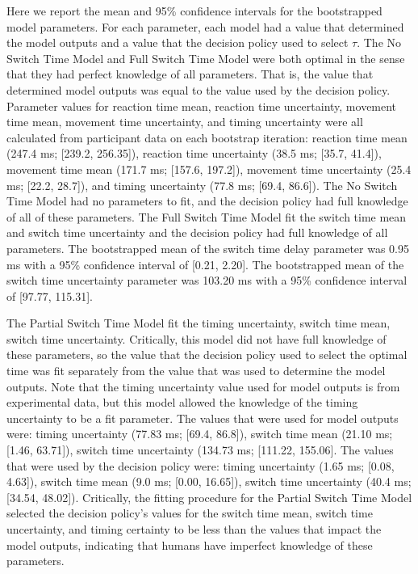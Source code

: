 \documentclass[12pt]{article}
\begin{document}
\noindent Here we report the mean and 95\% confidence intervals for the bootstrapped model parameters. For each parameter, each model had a value that determined the model outputs and a value that the decision policy used to select $\tau$. The No Switch Time Model and Full Switch Time Model were both optimal in the sense that they had perfect knowledge of all parameters. That is, the value that determined model outputs was equal to the value used by the decision policy. Parameter values for reaction time mean, reaction time uncertainty, movement time mean, movement time uncertainty, and timing uncertainty were all calculated from participant data on each bootstrap iteration: reaction time mean (247.4 ms; [239.2, 256.35]), reaction time uncertainty (38.5 ms; [35.7, 41.4]), movement time mean (171.7 ms; [157.6, 197.2]), movement time uncertainty (25.4 ms; [22.2, 28.7]), and timing uncertainty (77.8 ms; [69.4, 86.6]). The No Switch Time Model had no parameters to fit, and the decision policy had full knowledge of all of these parameters. The Full Switch Time Model fit the switch time mean and switch time uncertainty and the decision policy had full knowledge of all parameters. The bootstrapped mean of the switch time delay parameter was 0.95 ms with a 95\% confidence interval of [0.21, 2.20]. The bootstrapped mean of the switch time uncertainty parameter was 103.20 ms with a 95\% confidence interval of [97.77, 115.31].

The Partial Switch Time Model fit the timing uncertainty, switch time mean, switch time uncertainty. Critically, this model did not have full knowledge of these parameters, so the value that the decision policy used to select the optimal time was fit separately from the value that was used to determine the model outputs. Note that the timing uncertainty value used for model outputs is from experimental data, but this model allowed the knowledge of the timing uncertainty to be a fit parameter. The values that were used for model outputs were: timing uncertainty (77.83 ms; [69.4, 86.8]), switch time mean (21.10 ms; [1.46, 63.71]), switch time uncertainty (134.73 ms; [111.22, 155.06]. The values that were used by the decision policy were: timing uncertainty (1.65 ms;  [0.08, 4.63]), switch time mean (9.0 ms; [0.00, 16.65]), switch time uncertainty (40.4 ms; [34.54, 48.02]). Critically, the fitting procedure for the Partial Switch Time Model selected the decision policy’s values for the switch time mean, switch time uncertainty, and timing certainty to be less than the values that impact the model outputs, indicating that  humans have imperfect knowledge of these parameters.
\end{document}
